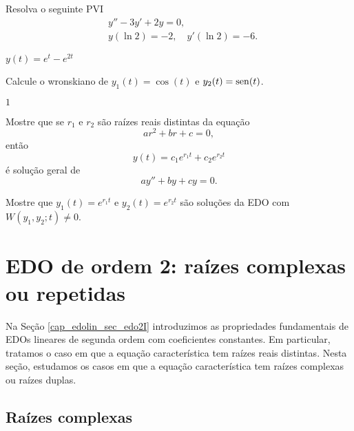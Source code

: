 \begin{exer}
  Resolva o seguinte PVI
  \begin{align}
    &y'' - 3y' + 2y = 0,\\
    &y(\ln 2) = -2,\quad y'(\ln 2) = -6.
  \end{align}
\end{exer}
\begin{resp}
  $y(t) = e^t - e^{2t}$
\end{resp}

\begin{exer}
  Calcule o wronskiano de $y_1(t) = \cos(t)$ e $y_2(t) = \operatorname{sen}(t)$.
\end{exer}
\begin{resp}
  $1$
\end{resp}

\begin{exer}
  Mostre que se $r_1$ e $r_2$ são raízes reais distintas da equação
  \begin{equation}
    ar^2 + br + c = 0,
  \end{equation}
  então
  \begin{equation}
    y(t) = c_1e^{r_1t} + c_2e^{r_2t}
  \end{equation}
  é solução geral de
  \begin{equation}
    ay'' + by + cy = 0.
  \end{equation}
\end{exer}
\begin{resp}
  Mostre que $y_1(t) = e^{r_1t}$ e $y_2(t) = e^{r_2t}$ são soluções da EDO com $W(y_1,y_2; t) \neq 0$.
\end{resp}


\section{EDO de ordem 2: raízes complexas ou repetidas}\label{cap_edolin_sec_edo2II}

Na Seção \ref{cap_edolin_sec_edo2I} introduzimos as propriedades fundamentais de EDOs lineares de segunda ordem com coeficientes constantes. Em particular, tratamos o caso em que a equação característica tem raízes reais distintas. Nesta seção, estudamos os casos em que a equação característica tem raízes complexas ou raízes duplas.

\subsection{Raízes complexas}

